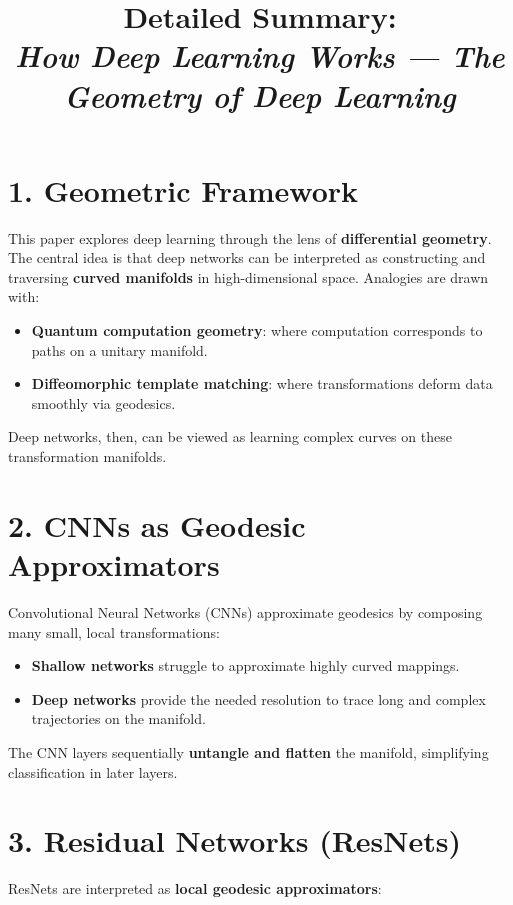 \documentclass[a4paper,11pt]{article}
\title{Detailed Summary:\\ \textit{How Deep Learning Works — The Geometry of Deep Learning}}
\author{}
\date{}
\begin{document}
\maketitle

\section*{1. Geometric Framework}

This paper explores deep learning through the lens of \textbf{differential geometry}. The central idea is that deep networks can be interpreted as constructing and traversing \textbf{curved manifolds} in high-dimensional space. Analogies are drawn with:

\begin{itemize}
    \item \textbf{Quantum computation geometry}: where computation corresponds to paths on a unitary manifold.
    \item \textbf{Diffeomorphic template matching}: where transformations deform data smoothly via geodesics.
\end{itemize}

Deep networks, then, can be viewed as learning complex curves on these transformation manifolds.

\section*{2. CNNs as Geodesic Approximators}

Convolutional Neural Networks (CNNs) approximate geodesics by composing many small, local transformations:

\begin{itemize}
    \item \textbf{Shallow networks} struggle to approximate highly curved mappings.
    \item \textbf{Deep networks} provide the needed resolution to trace long and complex trajectories on the manifold.
\end{itemize}

The CNN layers sequentially \textbf{untangle and flatten} the manifold, simplifying classification in later layers.

\section*{3. Residual Networks (ResNets)}

ResNets are interpreted as \textbf{local geodesic approximators}:
\end{document}
